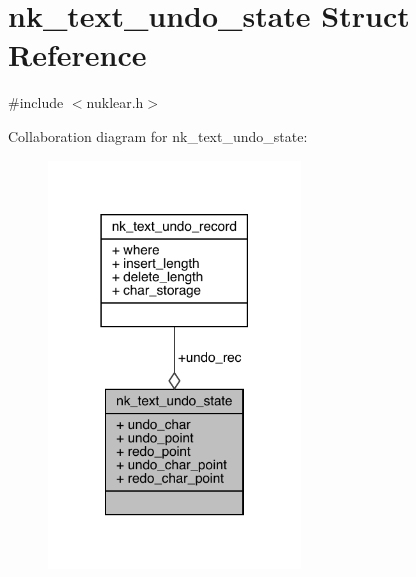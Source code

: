\hypertarget{structnk__text__undo__state}{}\section{nk\+\_\+text\+\_\+undo\+\_\+state Struct Reference}
\label{structnk__text__undo__state}


{\ttfamily \#include $<$nuklear.\+h$>$}



Collaboration diagram for nk\+\_\+text\+\_\+undo\+\_\+state\+:
\nopagebreak
\begin{figure}[H]
\begin{center}
\leavevmode
\includegraphics[width=190pt]{structnk__text__undo__state__coll__graph}
\end{center}
\end{figure}

